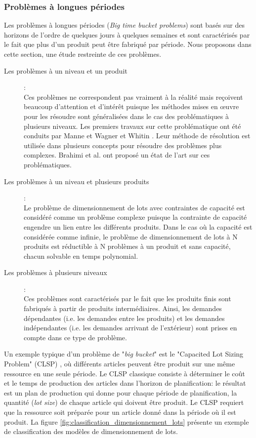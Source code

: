 	\subsubsection{Problèmes à longues périodes}
	Les problèmes à longues périodes (\emph{Big time bucket problems}) sont basés sur des
horizons de l'ordre de quelques jours à quelques semaines et sont caractérisés par le fait que plus d'un produit peut être fabriqué par période. Nous proposons dans cette section, une étude restreinte de ces problèmes.
	
	\begin{description}
		\item[Les problèmes à un niveau et un produit]: \\
		Ces problèmes ne correspondent pas vraiment à la réalité mais reçoivent beaucoup d'attention et d'intérêt puisque les méthodes mises en œuvre pour les résoudre sont généralisées dans le cas des problématiques à plusieurs niveaux.
		Les premiers travaux sur cette problématique ont été conduits par Manne \cite{manne}
et Wagner et Whitin \cite{wagner_whitin}. Leur méthode de résolution est utilisée dans plusieurs
concepts pour résoudre des problèmes plus complexes. Brahimi et al. \cite{brahimi} ont proposé
un état de l'art sur ces problématiques.		
		\item[Les problèmes à un niveau et plusieurs produits]: \\
		Le problème de dimensionnement de lots avec contraintes de capacité est considéré comme un problème complexe puisque la contrainte de capacité engendre un
lien entre les différents produits. Dans le cas où la capacité est considérée comme
infinie, le problème de dimensionnement de lots à N produits est réductible à N
problèmes à un produit et sans capacité, chacun solvable en temps polynomial.
		\item[Les problèmes à plusieurs niveaux]: \\ 
		Ces problèmes sont caractérisés par le fait que les produits finis sont fabriqués à partir de produits intermédiaires. Ainsi, les demandes dépendantes (i.e. les demandes entre les produits) et les demandes indépendantes (i.e. les demandes arrivant de l'extérieur) sont prises en compte dans ce type de problème.
	\end{description}
	
	Un exemple typique d'un problème de "\emph{big bucket}" est le "Capacited Lot Sizing Problem" (CLSP) , où différents articles peuvent être produit sur une même ressource en une seule période. Le CLSP classique consiste à déterminer le coût et le temps de production des articles dans l'horizon de planification: le résultat est un plan de production qui donne pour chaque période de planification, la quantité (\emph{lot size}) de chaque article qui doivent être produit. Le CLSP requiert que la ressource soit préparée pour un article donné dans la période où il est produit. La figure \ref{fig:classification_dimensionnement_lots} présente un exemple de classification des modèles de dimensionnement de lots.
	
